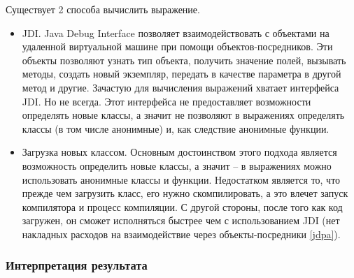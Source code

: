 Существует 2 способа вычислить выражение. 
\begin{itemize}
	\item JDI. Java Debug Interface позволяет взаимодействовать с объектами на удаленной виртуальной машине при помощи объектов-посредников. Эти объекты позволяют узнать тип объекта, получить значение полей, вызывать методы, создать новый экземпляр, передать в качестве параметра в другой метод и другие. Зачастую для вычисления выражений хватает интерфейса JDI. Но не всегда. Этот интерфейса не предоставляет возможности определять новые классы, а значит не позволяют в выражениях определять классы (в том числе анонимные) и, как следствие анонимные функции. 
	\item Загрузка новых классом. Основным достоинством этого подхода является возможность определить новые классы, а значит -- в выражениях можно использовать анонимные классы и функции. Недостатком является то, что прежде чем загрузить класс, его нужно скомпилировать, а это влечет запуск компилятора и процесс компиляции. С другой стороны, после того как код загружен, он сможет исполняться быстрее чем с использованием JDI (нет накладных расходов на взаимодействие через объекты-посредники \ref{jdpa}).
\end{itemize}

\subsubsection{Интерпретация результата}\label{interpret}

